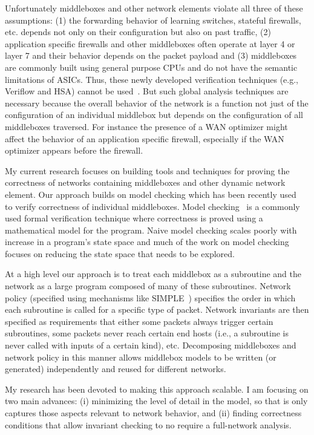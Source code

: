 \documentclass[letterpaper]{article}
\begin{document}
Unfortunately middleboxes and other network elements violate all three of these assumptions: (1) the forwarding behavior
of learning switches, stateful firewalls, etc. depends not only on their configuration but also on past traffic, (2)
application specific firewalls and other middleboxes often operate at layer 4 or layer 7 and their behavior depends on
the packet payload and (3) middleboxes are commonly built using general purpose CPUs and do not have the semantic
limitations of ASICs. Thus, these newly developed verification techniques (e.g., Veriflow and HSA) cannot be
used~\cite{panda2015new}. But such global analysis techniques are necessary because the overall behavior of the
network is a function not just of the configuration of an individual middlebox but depends on the configuration of all
middleboxes traversed. For instance the presence of a WAN optimizer might affect the behavior of an application
specific firewall, especially if the WAN optimizer appears before the firewall.

My current research focuses on building tools and techniques for proving the correctness of networks containing
middleboxes and other dynamic network element. Our approach builds on model checking which has been recently
used~\cite{dobrescu2014software} to verify correctness of individual middleboxes. Model
checking~\cite{jhala2009software, han2007providing} is a commonly used formal verification technique where correctness
is proved using a mathematical model for the program.  Naive model checking scales poorly with increase in a program's
state space and much of the work on model checking focuses on reducing the state space that needs to be explored.

At a high level our approach is to treat each middlebox as a subroutine and the network as a large program composed of
many of these subroutines. Network policy (specified using mechanisms like SIMPLE~\cite{qazi2013simple}) specifies
the order in which each subroutine is called for a specific type of packet. Network invariants are then specified as
requirements that either some packets always trigger certain subroutines, some packets never reach certain end hosts
(i.e., a subroutine is never called with inputs of a certain kind), etc. Decomposing middleboxes and network policy in
this manner allows middlebox models to be written (or generated) independently and reused for different networks.

My research has been devoted to making this approach scalable. I am focusing on two main advances: (i) minimizing the level of detail in the model, so that is only captures those aspects relevant to network behavior, and (ii) finding correctness conditions that allow invariant checking to no require a full-network analysis.
\end{document}
